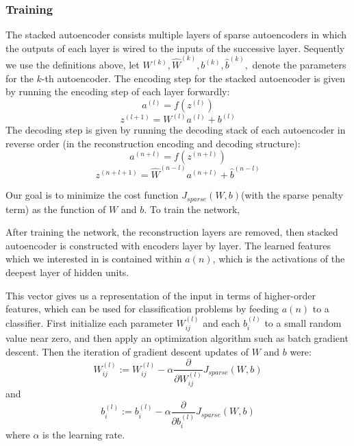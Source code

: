 \documentclass[journal]{IEEEtran}
\begin{document}
\subsubsection{Training}
The stacked autoencoder consists multiple layers of sparse autoencoders in which the outputs of each layer is wired to the inputs of the successive layer. Sequently we use the definitions above, let $W^{(k)}, \hat{W}^{(k)}, b^{(k)}, \hat{b}^{(k)},$ denote the parameters for the $k$-th autoencoder. The encoding step for the stacked autoencoder is given by running the encoding step of each layer forwardly:
\begin{equation}
a^{(l)} = f(z^{(l)})
\end{equation}
\begin{equation}
z^{(l+1)} = W^{(l)}a^{(l)} + b^{(l)}
\end{equation}
The decoding step is given by running the decoding stack of each autoencoder in reverse order (in the reconstruction encoding and decoding structure):
\begin{equation}
a^{(n + l)} = f(z^{(n + l)}) 
\end{equation}
\begin{equation}
z^{(n + l + 1)} = \hat{W}^{(n - l)}a^{(n + l)} + \hat{b}^{(n - l)}
\end{equation}

Our goal is to minimize the cost function $J_{sparse}(W, b)$(with the sparse penalty term) as the function of $W$ and $b$. To train the network, 

After training the network, the reconstruction layers are removed, then stacked autoencoder is constructed with encoders layer by layer. The learned features which we interested in is contained within $a(n)$, which is the activations of the deepest layer of hidden units. 


This vector gives us a representation of the input in terms of higher-order features, which can be used for classification problems by feeding $a(n)$ to a classifier. First initialize each parameter $W^{(l)}_{ij}$ and each $b^{(l)}_i$ to a small random value near zero, and then apply an optimization algorithm such as batch gradient descent. Then the iteration of gradient descent updates of $W$ and $b$ were:
\begin{equation}
W_{ij}^{(l)}  := W_{ij}^{(l)} - \alpha \frac{\partial}{\partial W_{ij}^{(l)}} J_{sparse}(W,b) 
\end{equation}
and
\begin{equation}
b_{i}^{(l)}  := b_{i}^{(l)} - \alpha \frac{\partial}{\partial b_{i}^{(l)}} J_{sparse}(W,b)
\end{equation}
where $\alpha$ is the learning rate.
\end{document}
